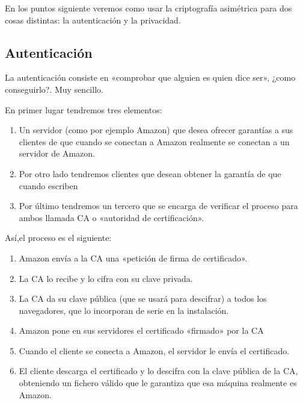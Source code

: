 \documentclass[letterpaper,10pt,spanish]{sphinxmanual}
\begin{document}
En los puntos siguiente veremos como usar la criptografía asimétrica para dos cosas distintas: la autenticación y la privacidad.


\subsection{Autenticación}
\label{\detokenize{tema_pautas_seguridad_informatica/tema_pautas_seguridad_informatica:autenticacion}}
La autenticación consiste en «comprobar que alguien es quien dice ser», ¿como conseguirlo?. Muy sencillo.

En primer lugar tendremos tres elementos:
\begin{enumerate}
%
\item {} 
Un servidor (como por ejemplo Amazon) que desea ofrecer garantías a sus clientes de que cuando se conectan a Amazon realmente se conectan a un servidor de Amazon.

\item {} 
Por otro lado tendremos clientes que desean obtener la garantía de que cuando escriben  

\item {} 
Por último tendremos un tercero que se encarga de verificar el proceso para ambos llamada CA o «autoridad de certificación».

\end{enumerate}

Así,el proceso es el siguiente:
\begin{enumerate}
%
\item {} 
Amazon envía a la CA una «petición de firma de certificado».

\item {} 
La CA lo recibe y lo cifra con su clave privada.

\item {} 
La CA da su clave pública (que se usará para descifrar) a todos los navegadores, que lo incorporan de serie en la instalación.

\item {} 
Amazon pone en sus servidores el certificado «firmado» por la CA

\item {} 
Cuando el cliente se conecta a Amazon, el servidor le envía el certificado.

\item {} 
El cliente descarga el certificado y lo descifra con la clave pública de la CA, obteniendo un fichero válido que le garantiza que esa máquina realmente es Amazon.

\end{enumerate}
\end{document}
